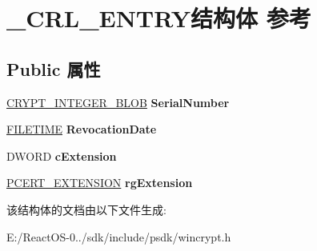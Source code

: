 \hypertarget{struct___c_r_l___e_n_t_r_y}{}\section{\+\_\+\+C\+R\+L\+\_\+\+E\+N\+T\+R\+Y结构体 参考}
\label{struct___c_r_l___e_n_t_r_y}
\subsection*{Public 属性}
\begin{DoxyCompactItemize}
\item 
\mbox{\label{struct___c_r_l___e_n_t_r_y_a61c30cbc57ea9a1925dadf4510d262d4}} 
\hyperlink{struct___c_r_y_p_t_o_a_p_i___b_l_o_b}{C\+R\+Y\+P\+T\+\_\+\+I\+N\+T\+E\+G\+E\+R\+\_\+\+B\+L\+OB} {\bfseries Serial\+Number}
\item 
\mbox{\label{struct___c_r_l___e_n_t_r_y_a3e5bd33981d8faba892b2415f5fc24cb}} 
\hyperlink{struct___f_i_l_e_t_i_m_e}{F\+I\+L\+E\+T\+I\+ME} {\bfseries Revocation\+Date}
\item 
\mbox{\label{struct___c_r_l___e_n_t_r_y_af050687cf8098c1cee422e2fba425c92}} 
D\+W\+O\+RD {\bfseries c\+Extension}
\item 
\mbox{\label{struct___c_r_l___e_n_t_r_y_a5d52550d5b885416093ed34cd445303c}} 
\hyperlink{struct___c_e_r_t___e_x_t_e_n_s_i_o_n}{P\+C\+E\+R\+T\+\_\+\+E\+X\+T\+E\+N\+S\+I\+ON} {\bfseries rg\+Extension}
\end{DoxyCompactItemize}


该结构体的文档由以下文件生成\+:\begin{DoxyCompactItemize}
\item 
E\+:/\+React\+O\+S-\/0../sdk/include/psdk/wincrypt.\+h\end{DoxyCompactItemize}
